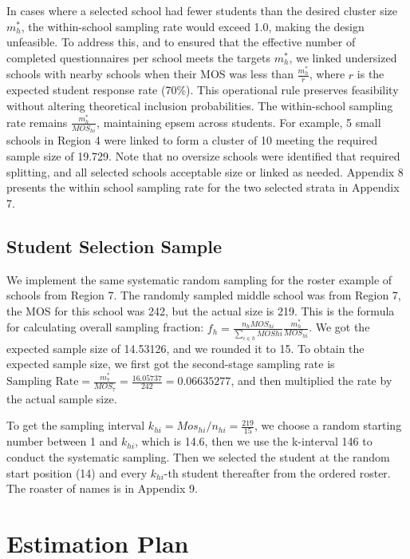 \documentclass[
  12pt]{article}
\begin{document}
In cases where a selected school had fewer students than the desired
cluster size \(m^*_h\), the within-school sampling rate would exceed
1.0, making the design unfeasible. To address this, and to ensured that
the effective number of completed questionnaires per school meets the
targets \(m^*_h\), we linked undersized schools with nearby schools when
their MOS was less than \(\frac{m^*_h}{r}\), where \(r\) is the expected
student response rate (70\%). This operational rule preserves
feasibility without altering theoretical inclusion probabilities. The
within-school sampling rate remains \(\frac{m^*_h}{MOS_{hi}}\),
maintaining epsem across students. For example, 5 small schools in
Region 4 were linked to form a cluster of 10 meeting the required sample
size of 19.729. Note that no oversize schools were identified that
required splitting, and all selected schools acceptable size or linked
as needed. Appendix 8 presents the within school sampling rate for the
two selected strata in Appendix 7.

\subsection{Student Selection Sample}\label{student-selection-sample}

We implement the same systematic random sampling for the roster example
of schools from Region 7. The randomly sampled middle school was from
Region 7, the MOS for this school was 242, but the actual size is 219.
This is the formula for calculating overall sampling fraction:
\(f_h = \frac{n_h MOS_{hi} }{\sum_{i \in h} MOS{hi} } \frac{m^*_h}{MOS_{hi}}\).
We got the expected sample size of 14.53126, and we rounded it to 15. To
obtain the expected sample size, we first got the second-stage sampling
rate is
\(\text{Sampling Rate} = \frac{m^*_{7}}{MOS_7} = \frac{16.05737}{242} = 0.06635277\),
and then multiplied the rate by the actual sample size.

To get the sampling interval
\(k_{hi} = Mos_{hi} / n_{hi} = \frac{219}{15}\), we choose a random
starting number between 1 and \(k_{hi}\), which is 14.6, then we use the
k-interval 146 to conduct the systematic sampling. Then we selected the
student at the random start position (14) and every \(k_{hi}\)-th
student thereafter from the ordered roster. The roaster of names is in
Appendix 9.

\section{Estimation Plan}\label{estimation-plan}
\end{document}

